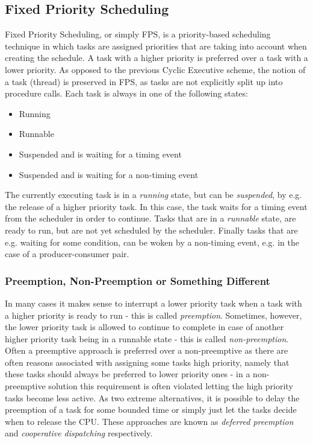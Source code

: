 
\subsection{Fixed Priority Scheduling}
Fixed Priority Scheduling, or simply FPS, is a priority-based scheduling technique in which tasks are assigned priorities that are taking into account when creating the schedule. A task with a higher priority is preferred over a task with a lower priority. As opposed to the previous Cyclic Executive scheme, the notion of a task (thread) is preserved in FPS, as tasks are not explicitly split up into procedure calls. Each task is always in one of the following states:

\begin{itemize}
	\item Running
	\item Runnable
	\item Suspended and is waiting for a timing event
	\item Suspended and is waiting for a non-timing event
\end{itemize}

The currently executing task is in a \textit{running} state, but can be \textit{suspended}, by e.g. the release of a higher priority task. In this case, the task waits for a timing event from the scheduler in order to continue. Tasks that are in a \textit{runnable} state, are ready to run, but are not yet scheduled by the scheduler. Finally tasks that are e.g. waiting for some condition, can be woken by a non-timing event, e.g. in the case of a producer-consumer pair. 

\subsubsection{Preemption, Non-Preemption or Something Different}
In many cases it makes sense to interrupt a lower priority task when a task with a higher priority is ready to run - this is called \textit{preemption}. Sometimes, however, the lower priority task is allowed to continue to complete in case of another higher priority task being in a runnable state - this is called \textit{non-preemption}. Often a preemptive approach is preferred over a non-preemptive as there are often reasons associated with assigning some tasks high priority, namely that these tasks should always be preferred to lower priority ones - in a non-preemptive solution this requirement is often violated letting the high priority tasks become less active. As two extreme alternatives, it is possible to delay the preemption of a task for some bounded time or simply just let the tasks decide when to release the CPU. These approaches are known as \textit{deferred preemption} and \textit{cooperative dispatching} respectively.

